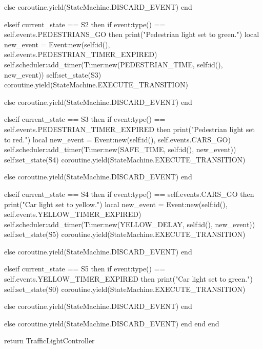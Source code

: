 \begin{appendices}
\begin{listing}[htp]
\begin{luacode}
			else
				coroutine.yield(StateMachine.DISCARD_EVENT)
			end
			
		elseif current_state == S2 then
			if event:type() == self.events.PEDESTRIANS_GO then
				print("Pedestrian light set to green.")
				local new_event = Event:new(self:id(), self.events.PEDESTRIAN_TIMER_EXPIRED)
				self.scheduler:add_timer(Timer:new(PEDESTRIAN_TIME, self:id(), new_event))
				self:set_state(S3)
				coroutine.yield(StateMachine.EXECUTE_TRANSITION)

			else
				coroutine.yield(StateMachine.DISCARD_EVENT)
			end

		elseif current_state == S3 then
			if event:type() == self.events.PEDESTRIAN_TIMER_EXPIRED then
				print("Pedestrian light set to red.")
				local new_event = Event:new(self:id(), self.events.CARS_GO)
				self.scheduler:add_timer(Timer:new(SAFE_TIME, self:id(), new_event))
				self:set_state(S4)
				coroutine.yield(StateMachine.EXECUTE_TRANSITION)

			else
				coroutine.yield(StateMachine.DISCARD_EVENT)
			end

		elseif current_state == S4 then
			if event:type() == self.events.CARS_GO then
				print("Car light set to yellow.")
				local new_event = Event:new(self:id(), self.events.YELLOW_TIMER_EXPIRED)
				self.scheduler:add_timer(Timer:new(YELLOW_DELAY, self:id(), new_event))
				self:set_state(S5)
				coroutine.yield(StateMachine.EXECUTE_TRANSITION)

			else
				coroutine.yield(StateMachine.DISCARD_EVENT)
			end

		elseif current_state == S5 then
			if event:type() == self.events.YELLOW_TIMER_EXPIRED then
				print("Car light set to green.")
				self:set_state(S0)
				coroutine.yield(StateMachine.EXECUTE_TRANSITION)
			
			else
				coroutine.yield(StateMachine.DISCARD_EVENT)
			end

		else
			coroutine.yield(StateMachine.DISCARD_EVENT)
		end
	end
end

return TrafficLightController
\end{luacode}
\end{listing}

\begin{listing}
\begin{luacode}


\end{luacode}
\end{listing}

\begin{listing}
\begin{luacode}


\end{luacode}
\end{listing}

\end{appendices}